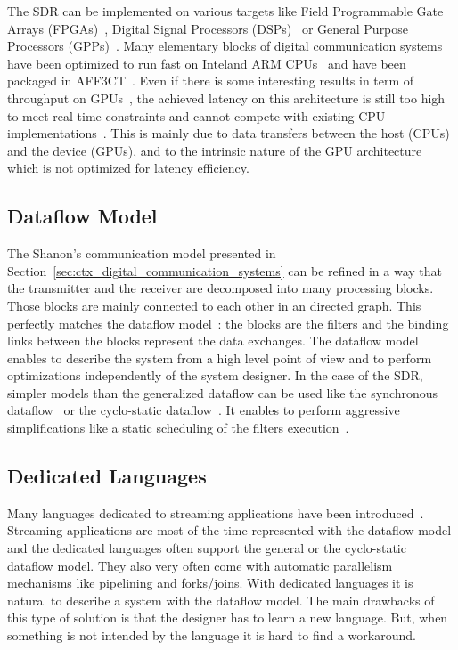 The SDR can be implemented on various targets like Field Programmable Gate
Arrays (FPGAs)~\cite{Coulton2004,Skey2006,Dutta2010,Shaik2013,Maheshwarappa2015,
Nivin2016}, Digital Signal Processors (DSPs)~\cite{Kaur2008,Karlsson2013,
Shaik2013} or General Purpose Processors (GPPs)~\cite{Yoge2012,Bang2014,
Meshram2019,Grayver2020}. Many elementary blocks of digital communication
systems have been optimized to run fast on Intel\R and ARM\R
CPUs~\cite{Cassagne2015c,Cassagne2016a,Cassagne2016b,Cassagne2018,Leonardon2019,
Ghaffari2019} and have been packaged in AFF3CT~\cite{Cassagne2017a,
Cassagne2019a}. Even if there is some interesting results in term of throughput
on GPUs~\cite{Xianjun2013,Li2014,LeGal2014a,Giard2016b,Keskin2017a}, the
achieved latency on this architecture is still too high to meet real time
constraints and cannot compete with existing CPU
implementations~\cite{LeGal2015a,Cassagne2015c,Giard2016b,Cassagne2016a,
LeGal2017,Leonardon2019,LeGal2019a}. This is mainly due to data transfers
between the host (CPUs) and the device (GPUs), and to the intrinsic nature of
the GPU architecture which is not optimized for latency efficiency.

\subsection{Dataflow Model}

The Shanon's communication model presented in
Section~\ref{sec:ctx_digital_communication_systems} can be refined in a way
that the transmitter and the receiver are decomposed into many processing
blocks. Those blocks are mainly connected to each other in an directed graph.
This perfectly matches the dataflow model~\cite{Dennis1980,Ackerman1982}: the
blocks are the filters and the binding links between the blocks represent the
data exchanges. The dataflow model enables to describe the system from a high
level point of view and to perform optimizations independently of the system
designer. In the case of the SDR, simpler models than the generalized dataflow
can be used like the synchronous dataflow~\cite{Lee1987} or the cyclo-static
dataflow~\cite{Engels1994,Bilsen1995}. It enables to perform aggressive
simplifications like a static scheduling of the filters
execution~\cite{Parks1995}.

\subsection{Dedicated Languages}

Many languages dedicated to streaming applications have been
introduced~\cite{Buck2004,Amarasinghe2005,Liao2006,Black-Schaffer2010,
Glitia2010,Thies2010,DeOliveiraCastro2017}. Streaming applications are most of
the time represented with the dataflow model and the dedicated languages often
support the general or the cyclo-static dataflow model. They also very often
come with automatic parallelism mechanisms like pipelining and forks/joins. With
dedicated languages it is natural to describe a system with the dataflow model.
The main drawbacks of this type of solution is that the designer has to learn a
new language. But, when something is not intended by the language it is hard to
find a workaround.

